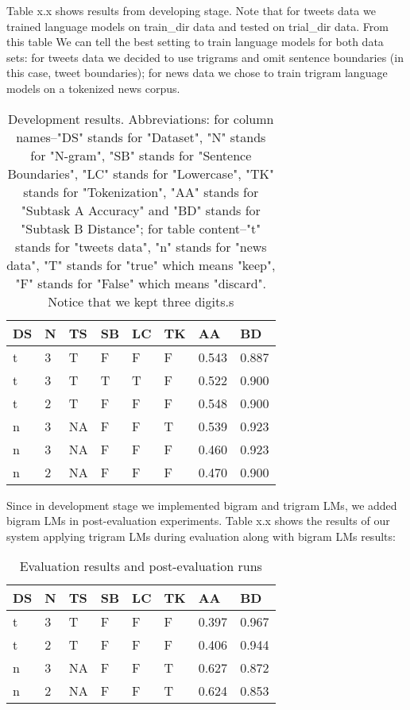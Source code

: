 \documentclass[11pt,a4paper]{article}
\begin{document}
Table x.x shows results from developing stage. Note that for tweets data we trained language models on train\_dir data and tested on trial\_dir data. From this table We can tell the best setting to train language models for both data sets: for tweets data we decided to use trigrams and omit sentence boundaries (in this case, tweet boundaries); for news data we chose to train trigram language models on a tokenized news corpus.

\begin{table}[h!]
\begin{tabular}{ |p{0.5cm}|p{0.5cm}|p{0.5cm}|p{0.5cm}|p{0.5cm}|p{0.5cm}|p{0.7cm}|p{0.7cm}|}
\hline
DS & N & TS  & SB & LC & TK & AA & BD \\
\hline
t & 3 & T & F & F & F & 0.543 & 0.887 \\
\hline
t & 3 & T & T & T & F & 0.522 & 0.900 \\
\hline
t & 2 & T & F & F & F & 0.548 & 0.900 \\ 
\hline
n & 3 & NA & F & F & T & 0.539 & 0.923 \\
\hline
n & 3 & NA & F & F & F & 0.460 & 0.923 \\
\hline
n & 2 & NA & F & F & F & 0.470 & 0.900 \\
\hline
\end{tabular}
\caption{Development results. Abbreviations: for column names--"DS" stands for "Dataset", "N" stands for "N-gram", "SB" stands for "Sentence Boundaries", "LC" stands for "Lowercase", "TK" stands for "Tokenization", "AA" stands for "Subtask A Accuracy" and "BD" stands for "Subtask B Distance"; for table content--"t" stands for "tweets data", "n" stands for "news data", "T" stands for "true" which means "keep", "F" stands for "False" which means "discard". Notice that we kept three digits.s}
 
\label{table:3}
\end{table}
Since in development stage we implemented bigram and trigram LMs, we added bigram LMs in post-evaluation experiments. Table x.x shows the results of our system applying trigram LMs during evaluation along with bigram LMs results: 

\begin{table}[h!]
\begin{tabular}{ |p{0.5cm}|p{0.5cm}|p{0.5cm}|p{0.5cm}|p{0.5cm}|p{0.5cm}|p{0.7cm}|p{0.7cm}|}
\hline
DS & N & TS  & SB & LC & TK & AA & BD \\
\hline
t & 3 & T & F & F & F & 0.397 & 0.967 \\
\hline
t & 2 & T & F & F & F & 0.406 & 0.944 \\
\hline
n & 3 & NA & F & F & T & 0.627 & 0.872 \\
\hline
n & 2 & NA & F & F & T & 0.624 & 0.853 \\
\hline
\end{tabular}
\caption{Evaluation results and post-evaluation runs}
\label{table:4}
\end{table}
\end{document}
